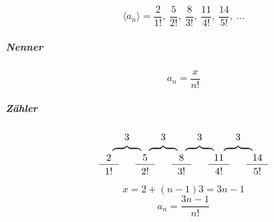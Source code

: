 \begin{uebung}[3]
    \begin{aufgabe}
        \[
            \langle a_n \rangle = \frac{2}{1!},\ \frac{5}{2!},\ \frac{8}{3!},\ \frac{11}{4!},\ \frac{14}{5!},\ \ldots
        \]
    \end{aufgabe}

    \begin{loesung}
        \subparagraph{Nenner}
        \[
            a_n = \frac{x}{n!}  
        \]
        \subparagraph{Zähler}
        \[
            \begin{tabular}{ccccccccccccc}
                & 3 && 3 && 3 && 3 \\[-3pt]
                & \obf && \obf && \obf && \obf \\
                2 && 5 && 8 && 11 && 14 \\
                \cline{1-1} \cline{3-3} \cline{5-5} \cline{7-7} \cline{9-9}\\[-10pt]
                1! && 2! && 3! && 4! && 5! \\
            \end{tabular}
        \]
        \[
            x = 2 + (n-1) 3 = 3n - 1
        \]
        \[
            a_n = \frac{3n - 1}{n!}
        \]
    \end{loesung}    
\end{uebung}


